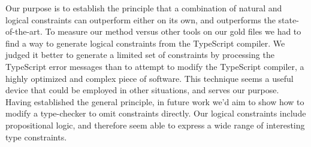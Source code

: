 \documentclass[sigplan,10pt,anonymous]{acmart} %
\theoremstyle{plain}
\theoremstyle{remark}
\theoremstyle{definition}
\begin{document}
Our purpose is to establish the principle that a combination of natural and logical constraints can outperform either on its own, and outperforms the state-of-the-art.
%
To measure our method versus other tools on our gold files we had to find a way to generate logical constraints from the TypeScript compiler.
%
We judged it better to generate a limited set of constraints by processing the TypeScript error messages than to attempt to modify the TypeScript compiler, a highly optimized and complex piece of software.
%
This technique seems a useful device that could be employed in other situations, and serves our purpose.
%
Having established the general principle, in future work we'd aim to show how to modify a type-checker to omit constraints directly.
%
Our logical constraints include propositional logic, and therefore seem able to express a wide range of interesting type constraints.

\end{document}
